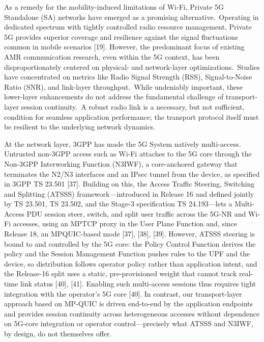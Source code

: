 \documentclass[preprint,11pt]{elsarticle}
\begin{document}
As a remedy for the mobility-induced limitations of Wi-Fi, Private 5G Standalone (SA) networks have emerged as a promising alternative.~Operating in dedicated spectrum with tightly controlled radio resource management, Private 5G provides superior coverage and resilience against the signal fluctuations common in mobile scenarios [19]. However, the predominant focus of existing AMR communication research, even within the 5G context, has been disproportionately centered on physical- and network-layer optimizations.~Studies have concentrated on metrics like Radio Signal Strength (RSS), Signal-to-Noise Ratio (SNR), and link-layer throughput.~While undeniably important, these lower-layer enhancements do not address the fundamental challenge of transport-layer session continuity.~A robust radio link is a necessary, but not sufficient, condition for seamless application performance; the transport protocol itself must be resilient to the underlying network dynamics.

At the network layer, 3GPP has made the 5G System natively multi-access. Untrusted non-3GPP access such as Wi-Fi attaches to the 5G core through the Non-3GPP Interworking Function (N3IWF), a core-anchored gateway that terminates the N2/N3 interfaces and an IPsec tunnel from the device, as specified in 3GPP TS 23.501 [37]. Building on this, the Access Traffic Steering, Switching and Splitting (ATSSS) framework---introduced in Release 16 and defined jointly by TS 23.501, TS 23.502, and the Stage-3 specification TS 24.193---lets a Multi-Access PDU session steer, switch, and split user traffic across the 5G-NR and Wi-Fi accesses, using an MPTCP proxy in the User Plane Function and, since Release 18, an MPQUIC-based mode [37], [38], [39]. However, ATSSS steering is bound to and controlled by the 5G core: the Policy Control Function derives the policy and the Session Management Function pushes rules to the UPF and the device, so distribution follows operator policy rather than application intent, and the Release-16 split uses a static, pre-provisioned weight that cannot track real-time link status [40], [41]. Enabling such multi-access sessions thus requires tight integration with the operator's 5G core [40]. In contrast, our transport-layer approach based on MP-QUIC is driven end-to-end by the application endpoints and provides session continuity across heterogeneous accesses without dependence on 5G-core integration or operator control---precisely what ATSSS and N3IWF, by design, do not themselves offer.
\end{document}

